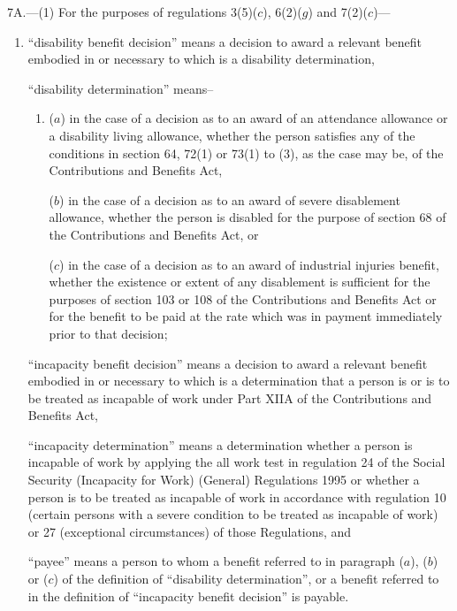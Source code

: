 \documentclass[12pt,a4paper]{article}
\begin{document}
7A.---(1)  For the purposes of regulations 3(5)($c$), 6(2)($g$) and 7(2)($c$)---
\begin{enumerate}\item[]
“disability benefit decision” means a decision to award a relevant benefit embodied in or necessary to which is a disability determination,

“disability determination” means–
\begin{enumerate}\item[]
($a$)
in the case of a decision as to an award of an attendance allowance or a disability living allowance, whether the person satisfies any of the conditions in section 64, 72(1) or 73(1) to (3), as the case may be, of the Contributions and Benefits Act,

($b$)
in the case of a decision as to an award of severe disablement allowance, whether the person is disabled for the purpose of section 68 of the Contributions and Benefits Act, or

($c$)
in the case of a decision as to an award of industrial injuries benefit, whether the existence or extent of any disablement is sufficient for the purposes of section 103 or 108 of the Contributions and Benefits Act or for the benefit to be paid at the rate which was in payment immediately prior to that decision;
\end{enumerate}

“incapacity benefit decision” means a decision to award a relevant benefit embodied in or necessary to which is a determination that a person is or is to be treated as incapable of work under Part XIIA of the Contributions and Benefits Act,

\begin{sloppypar}
“incapacity determination” means a determination whether a person is incapable of work by applying the all work test in regulation 24 of the Social Security (Incapacity for Work) (General) Regulations 1995 or whether a person is to be treated as incapable of work in accordance with regulation 10 (certain persons with a severe condition to be treated as incapable of work) or 27 (exceptional circumstances) of those Regulations, and
\end{sloppypar}

“payee” means a person to whom a benefit referred to in paragraph ($a$), ($b$) or ($c$) of the definition of “disability determination”, or a benefit referred to in the definition of “incapacity benefit decision” is payable.
\end{enumerate}
\end{document}
